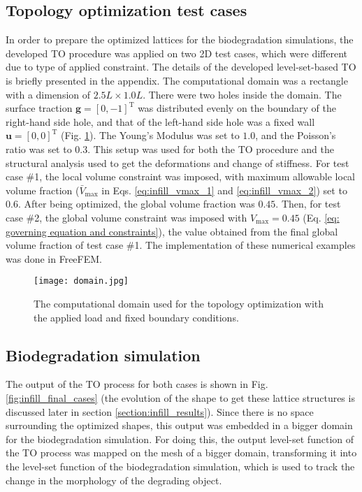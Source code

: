 \subsection{Topology optimization test cases}\label{Section: numerical examples}
In order to prepare the optimized lattices for the biodegradation simulations, the developed \gls{TO} procedure was applied on two 2D test cases, which were different due to type of applied constraint. The details of the developed level-set-based \gls{TO} is briefly presented in the appendix. The computational domain was a rectangle with a dimension of $2.5L \times 1.0L$. There were two holes inside the domain. The surface traction $\boldsymbol{g}=\left[0,-1\right]^{\operatorname{T}}$ was distributed evenly on the boundary of the right-hand side hole, and that of the left-hand side hole was a fixed wall $\boldsymbol{u}=\left[0,0\right]^{\operatorname{T}}$ (Fig. \ref{fig:infill_domain}). The Young's Modulus was set to $1.0$, and the Poisson's ratio was set to $0.3$. This setup was used for both the \gls{TO} procedure and the structural analysis used to get the deformations and change of stiffness. For test case \#1, the local volume constraint was imposed, with maximum allowable local volume fraction ($\bar{V}_{\max}$ in Eqs. \ref{eq:infill_vmax_1} and \ref{eq:infill_vmax_2}) set to $0.6$. After being optimized, the global volume fraction was $0.45$. Then, for test case \#2, the global volume constraint was imposed with $V_{\max}=0.45$ (Eq. \ref{eq: governing equation and constraints}), the value obtained from the final global volume fraction of test case \#1. The implementation of these numerical examples was done in FreeFEM.

\begin{figure}[h]
\centering
\medskip
\texttt{[image: domain.jpg]}
\caption[Computational domain for the topology optimization]{The computational domain used for the topology optimization with the applied load and fixed boundary conditions.} \label{fig:infill_domain}
\end{figure}

\subsection{Biodegradation simulation}\label{section:biodegradation}

The output of the \gls{TO} process for both cases is shown in Fig. \ref{fig:infill_final_cases} (the evolution of the shape to get these lattice structures is discussed later in section \ref{section:infill_results}). Since there is no space surrounding the optimized shapes, this output was embedded in a bigger domain for the biodegradation simulation. For doing this, the output level-set function of the \gls{TO} process was mapped on the mesh of a bigger domain, transforming it into the level-set function of the biodegradation simulation, which is used to track the change in the morphology of the degrading object.

